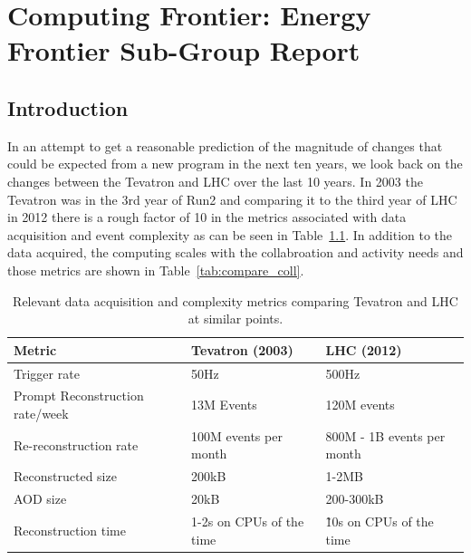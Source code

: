  
\chapter{Computing Frontier: Energy Frontier Sub-Group Report}
\label{chap:E2}


\begin{center}\begin{boldmath}



\end{boldmath}\end{center}


\section{Introduction}
\label{sec:comp-intro}

In an attempt to get a reasonable prediction of the magnitude of
changes that could be expected from a new program in the next ten
years, we look back on the changes between the Tevatron and LHC over
the last 10 years.  In 2003 the Tevatron was in the 3rd year of Run2
and comparing it to the third year of LHC in 2012 there is a rough
factor of 10 in the metrics associated with data acquisition and event
complexity as can be seen in Table~\ref{tab:compare_daq}. In addition
to the data acquired, the computing scales with the collabroation and
activity needs and those metrics are shown in
Table~\ref{tab:compare_coll}.

\begin{table}[t]
\begin{center}
\begin{tabular}{lll}
Metric & Tevatron (2003) & LHC (2012) \\ \hline
Trigger rate & 50Hz & 500Hz \\
Prompt Reconstruction rate/week & 13M Events & 120M events \\
Re-reconstruction rate & 100M events per month & 800M - 1B events per month \\
Reconstructed size & 200kB & 1-2MB \\
AOD size & 20kB & 200-300kB \\
Reconstruction time & 1-2s on CPUs of the time & \~ 10s on CPUs of the time \\ \hline
\end{tabular}
\caption{Relevant data acquisition and complexity metrics comparing Tevatron and LHC at similar points.}
\label{tab:compare_daq}
\end{center}
\end{table}


